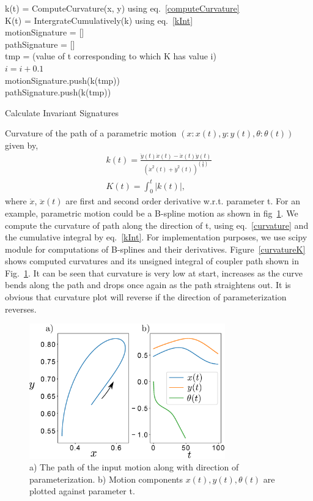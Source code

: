 \documentclass[twocolumn,10pt]{asme2e}
\begin{document}
\begin{algorithm}
    k(t) = ComputeCurvature(x, y) using eq.~\ref{computeCurvature} \\
    K(t) = IntergrateCumulatively(k) using eq.~\ref{kInt} \\
    motionSignature = [] \\
    pathSignature = [] \\
    {
      tmp = (value of t corresponding to which K has value i) \\
      $i = i + 0.1$ \\
      motionSignature.push(k(tmp)) \\
      pathSignature.push(k(tmp))
    }
    \caption{Calculate Invariant Signatures}
    \label{alg_signature}
\end{algorithm}

Curvature of the path of a parametric motion $(x:x(t), y:y(t), \theta:\theta(t))$ given by,
\begin{eqnarray}
  k(t) = \frac{\ddot{y}(t)\dot{x}(t) - \ddot{x}(t)\dot{y}(t)}{{(\dot{x}^2(t) + \dot{y}^2(t))}^{(\frac 32)}} \label{curvature}\\
  K(t) = \int^{t}_0 |k(t)| \label{kInt},
\end{eqnarray}
where $\dot{x}$, $\ddot{x}(t)$ are first and second order derivative w.r.t. parameter t.
For an example, parametric motion could be a B-spline motion as shown in fig~\ref{bsplineFitting}.
We compute the curvature of path along the direction of t, using eq.~\ref{curvature} and the cumulative integral by eq.~\ref{kInt}.
For implementation purposes, we use scipy\cite{scipy} module for computations of B-splines and their derivatives.
Figure~\ref{curvatureK} shows computed curvatures and its unsigned integral of coupler path shown in Fig.~\ref{bsplineFitting}.
It can be seen that curvature is very low at start, increases as the curve bends along the path and drops once again as the path straightens out.
It is obvious that curvature plot will reverse if the direction of parameterization reverses.

\begin{figure}
\centering
\includegraphics[width=240pt]{figure/fig_bspline.eps}
  \caption{a) The path of the input motion along with direction of parameterization. b) Motion components $x(t), y(t), \theta(t)$ are plotted against parameter t.}
\label{bsplineFitting}
\end{figure}
\end{document}
